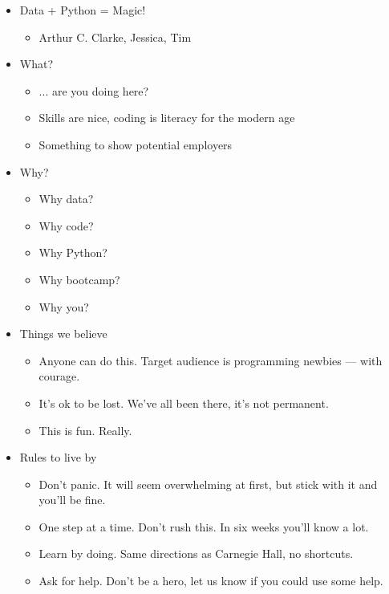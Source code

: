 \documentclass[11pt]{article}
\begin{document}
\begin{itemize}
\item Data + Python = Magic!
\begin{itemize}
\item Arthur C. Clarke, Jessica, Tim
\end{itemize}

\item What?
\begin{itemize}
\item ... are you doing here?
\item Skills are nice, coding is literacy for the modern age
\item Something to show potential employers
\end{itemize}

\item Why?
\begin{itemize}
\item Why data?
\item Why code?
\item Why Python?
\item Why bootcamp?
\item Why you?
\end{itemize}

\item Things we believe
\begin{itemize}
\item Anyone can do this.  Target audience is {programming newbies --- with courage}.
\item It's ok to be lost.  We've all been there, it's not permanent.
\item This is fun.  Really.
\end{itemize}


\item Rules to live by
\begin{itemize}
\item Don't panic.  It will seem overwhelming at first, but stick with it and you'll be fine.
\item One step at a time.  Don't rush this.  In six weeks you'll know a lot.
\item Learn by doing.  Same directions as Carnegie Hall, no shortcuts.
\item Ask for help.  Don't be a hero, let us know if you could use some help.
\end{itemize}


\end{itemize}
\end{document}
